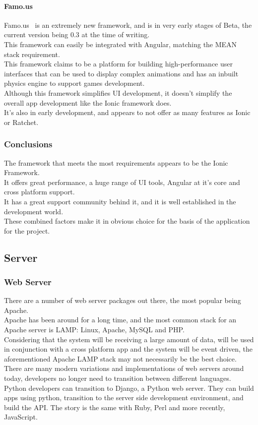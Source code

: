 \documentclass[preprint,12pt,3p]{elsarticle}
\begin{document}
\paragraph{Famo.us}
Famo.us~\cite{famous} is an extremely new framework, and is in very early stages of Beta, the current version being 0.3 at the time of writing.\\
This framework can easily be integrated with Angular, matching the MEAN stack requirement.\\
This framework claims to be a platform for building high-performance user interfaces that can be used to display complex animations and has an inbuilt physics engine to support games development.\\
Although this framework simplifies UI development, it doesn't simplify the overall app development like the Ionic framework does.\\
It's also in early development, and appears to not offer as many features as Ionic or Ratchet.

\subsubsection{Conclusions}
The framework that meets the most requirements appears to be the Ionic Framework.\\
It offers great performance, a huge range of UI tools, Angular at it's core and cross platform support.\\
It has a great support community behind it, and it is well established in the development world.\\
These combined factors make it in obvious choice for the basis of the application for the project.




\subsection{Server}

\subsubsection{Web Server}
There are a number of web server packages out there, the most popular being Apache.\\
Apache has been around for a long time, and the most common stack for an Apache server is LAMP: Linux, Apache, MySQL and PHP.\\
Considering that the system will be receiving a large amount of data, will be used in conjunction with a cross platform app and the system will be event driven, the aforementioned Apache LAMP stack may not necessarily be the best choice.\\
There are many modern variations and implementations of web servers around today, developers no longer need to transition between different languages. Python developers can transition to Django, a Python web server. They can build apps using python, transition to the server side development environment, and build the API. The story is the same with Ruby, Perl and more recently, JavaScript.\\
\end{document}
